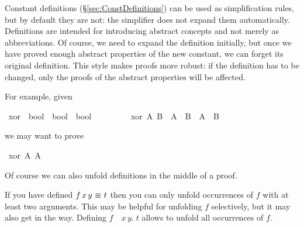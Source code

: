\begin{isabellebody}
{}
\isamarkuptrue%
%
\begin{isamarkuptext}%
\label{sec:Simp-with-Defs}
Constant definitions (\S\ref{sec:ConstDefinitions}) can be used as
simplification rules, but by default they are not: the simplifier does not
expand them automatically.  Definitions are intended for introducing abstract
concepts and not merely as abbreviations.  Of course, we need to expand
the definition initially, but once we have proved enough abstract properties
of the new constant, we can forget its original definition.  This style makes
proofs more robust: if the definition has to be changed,
only the proofs of the abstract properties will be affected.

For example, given%
\end{isamarkuptext}%
\isamarkuptrue%
\ xor\ {\isacharcolon}{\isacharcolon}\ {\isachardoublequote}bool\ {\isasymRightarrow}\ bool\ {\isasymRightarrow}\ bool{\isachardoublequote}\isanewline
\ \ \ \ \ \ \ \ \ {\isachardoublequote}xor\ A\ B\ {\isasymequiv}\ {\isacharparenleft}A\ {\isasymand}\ {\isasymnot}B{\isacharparenright}\ {\isasymor}\ {\isacharparenleft}{\isasymnot}A\ {\isasymand}\ B{\isacharparenright}{\isachardoublequote}\isamarkupfalse%
%
\begin{isamarkuptext}%
\noindent
we may want to prove%
\end{isamarkuptext}%
\isamarkuptrue%
\ {\isachardoublequote}xor\ A\ {\isacharparenleft}{\isasymnot}A{\isacharparenright}{\isachardoublequote}\isamarkupfalse%
\isamarkuptrue%
\isamarkupfalse%
\isamarkuptrue%
\isamarkupfalse%
\isamarkupfalse%
\isamarkupfalse%
\isamarkupfalse%
%
\begin{isamarkuptext}%
\noindent
Of course we can also unfold definitions in the middle of a proof.

\begin{warn}
  If you have defined $f\,x\,y~\emph{$\equiv$}~t$ then you can only unfold
  occurrences of $f$ with at least two arguments. This may be helpful for unfolding
  $f$ selectively, but it may also get in the way. Defining
  $f$~\isasymequiv~\isasymlambda$x\,y.\;t$ allows to unfold all occurrences of $f$.
\end{warn}


\end{isamarkuptext}
\end{isabellebody}
